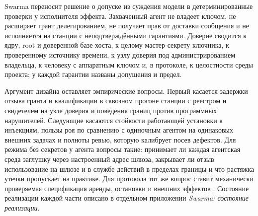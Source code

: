 \documentclass[10pt,a4paper]{article}
\begin{document}
Swarma переносит решение о допуске из суждения модели в детерминированные проверки у исполнителя эффекта. Захваченный агент не владеет ключом, не расширяет грант делегированием, не получает прав от доставки сообщения и не исполняется на станции с неподтверждёнными гарантиями. Доверие сводится к ядру, root и доверенной базе хоста, к целому мастер-секрету ключника, к проверенному источнику времени, к узлу доверия под администрированием владельца, к человеку с аппаратным ключом и, в протоколе, к целостности среды проекта; у каждой гарантии названы допущения и предел.

Аргумент дизайна оставляет эмпирические вопросы. Первый касается задержки отзыва гранта и квалификации в сквозном прогоне станции с реестром и свидетелем на узле доверия и поведения границ против программных нарушителей. Следующие касаются стойкости работающей установки к инъекциям, пользы роя по сравнению с одиночным агентом на одинаковых внешних задачах и полноты ревью, которую калибрует посев дефектов. Для режима без секретов у агента вопросы такие: принимает ли каждая агентская среда заглушку через настроенный адрес шлюза, закрывает ли отзыв использование на шлюзе и в службе действий в пределах границы и что растяжка утечки пропускает на практике. Для протокола тот же вопрос ставит механически проверяемая спецификация аренды, остановки и внешних эффектов \cite{tla}. Состояние реализации каждой части описано в отдельном приложении \emph{Swarma: состояние реализации}.

{\footnotesize

\let\origthebibliography\thebibliography
\renewcommand{\thebibliography}[1]{\origthebibliography{#1}\setlength{\itemsep}{0pt}\setlength{\parskip}{0pt}}

}
\end{document}
